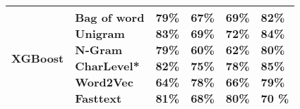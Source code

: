 \documentclass[11pt]{article}
\begin{document}
\begin{table*}[H]
\begin{tabular}{llllll}
\\\hline
XGBoost & \makecell{Bag of word\\  Unigram\\ N-Gram\\CharLevel*\\ Word2Vec \\ Fasttext} & 
\makecell{79\% \\83\%\\ 79\%\\ 82\% \\ 64\%\\ 81\%}&
\makecell{67\% \\ 69\%\\ 60\%\\75\% \\ 78\% \\ 68\%}&
\makecell{69\% \\ 72\%\\62\%\\78\% \\ 66\% \\ 80\%}&
\makecell{82\% \\ 84\%\\80\%\\85\%\\ 79\% \\70 \%}\\
\hline

\end{tabular}
\end{table*}
\end{document}
